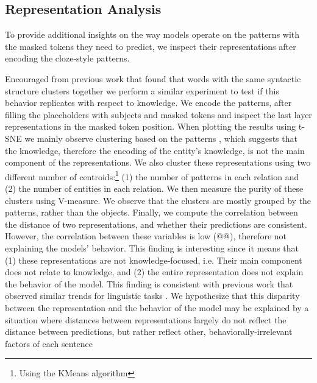 \subsection{Representation Analysis}


To provide additional insights on the way models operate on the patterns with the masked tokens they need to predict, we inspect their representations after encoding the cloze-style patterns.

Encouraged from previous work that found that words with the same syntactic structure clusters together \cite{chi-etal-2020-finding,ravfogel-etal-2020-unsupervised} we perform a similar experiment to test if this behavior replicates with respect to knowledge.
We encode the patterns, after filling the placeholders with subjects and masked tokens and inspect the last layer representations in the masked token position.
When plotting the results using t-SNE \cite{tsne} we mainly observe clustering based on the patterns  , which suggests that the knowledge, therefore the encoding of the entity's knowledge, is not the main component of the representations.
We also cluster these representations using two different number of centroids:\footnote {Using the KMeans algorithm} (1) the number of patterns in each relation and (2) the number of entities in each relation. We then measure the purity of these clusters using V-measure. We observe that the clusters are mostly grouped by the patterns, rather than the objects.
Finally, we compute the correlation between the distance of two representations, and whether their predictions are consistent. However, the correlation between these variables is low (@@), therefore not explaining the models' behavior.
This finding is interesting since it means that (1) these representations are not knowledge-focused, i.e. Their main component does not relate to knowledge, and (2) the entire representation does not explain the behavior of the model. This finding is consistent with previous work that observed similar trends for linguistic tasks \cite{amnesic_probing}.
We hypothesize that this disparity between the representation and the behavior of the model may be explained by a situation where distances between representations largely do not reflect the distance between predictions, but rather reflect other, behaviorally-irrelevant factors of each sentence


